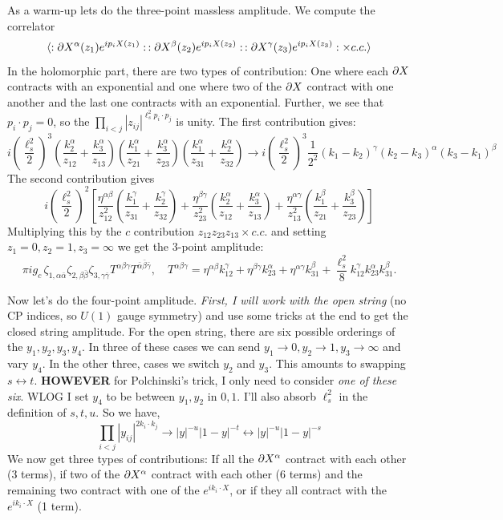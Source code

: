 \documentclass[11pt, class=article, crop=false]{standalone}
\begin{document}
\begin{enumerate}
	As a warm-up lets do the three-point massless amplitude. We compute the correlator
	\[
		\braket{:\partial X^\alpha(z_1) e^{i p_i X(z_1)}: \, :\partial X^\beta(z_2) e^{i p_i X(z_2)}: \, :\partial X^\gamma(z_3) e^{i p_i X(z_3)}: \times c.c.}
	\]
	In the holomorphic part, there are two types of contribution: One where each $\partial X$ contracts with an exponential and one where two of the $\partial X$ contract with one another and the last one contracts with an exponential. Further, we see that $p_i \cdot p_j = 0$, so the $\prod_{i<j} |z_{ij}|^{\ell_s^2 p_i \cdot p_j}$ is unity. The first contribution gives:
	\[
		i \left(\frac{\ell_s^2}{2}\right)^3 
		\left(\frac{k_2^\alpha}{z_{12}} + \frac{k_3^\alpha}{z_{13}}\right) 
		\left(\frac{k_1^\alpha}{z_{21}} + \frac{k_3^\alpha}{z_{23}}\right)
		\left(\frac{k_1^\alpha}{z_{31}} + \frac{k_2^\alpha}{z_{32}}\right)
		\to i  \left(\frac{\ell_s^2}{2}\right)^3 \frac{1}{2^2}  (k_1-k_2)^\gamma (k_2 - k_3)^\alpha (k_3 - k_1)^\beta
	\]
	The second contribution gives
	\[
		i \left(\frac{\ell_s^2}{2}\right)^2 
		\left[ \frac{\eta^{\alpha \beta}}{z_{12}^2} \left(\frac{k_1^\gamma}{z_{31}} + \frac{k_2^\gamma}{z_{32}} \right)
		+ \frac{\eta^{\beta \gamma}}{z_{23}^2} \left(\frac{k_2^\alpha}{z_{12}} + \frac{k_3^\alpha}{z_{13}} \right)
		+ \frac{\eta^{\alpha \gamma}}{z_{13}^2} \left(\frac{k_1^\beta}{z_{21}} + \frac{k_3^\beta}{z_{23}} \right) \right]
	\]
	Multiplying this by the $c$ contribution $z_{12} z_{23} z_{13} \times c.c.$ and setting $z_1 = 0, z_2 = 1, z_3 = \infty$ we get the 3-point amplitude:
	\begin{equation}\label{eq:3ptmassless}
		\pi i g_c \, \zeta_{1, \alpha \bar \alpha} \zeta_{2, \beta \bar \beta} \zeta_{3, \gamma \bar \gamma} T^{\alpha \beta \gamma} T^{\bar \alpha \bar \beta \bar \gamma}, \quad T^{\alpha \beta \gamma} = \eta^{\alpha \beta} k_{12}^\gamma + \eta^{\beta \gamma} k_{23}^\alpha + \eta^{\alpha \gamma} k_{31}^\beta + \frac{\ell_s^2}{8} k_{12}^\gamma k_{23}^\alpha k_{31}^\beta.
	\end{equation}
	
	Now let's do the four-point amplitude. \emph{First, I will work with the open string} (no CP indices, so $U(1)$ gauge symmetry) and use some tricks at the end to get the closed string amplitude. For the open string, there are six possible orderings of the $y_1, y_2, y_3, y_4$. In three of these cases we can send $y_1\to 0, y_2 \to 1, y_3 \to \infty$ and vary $y_4$. In the other three, cases we switch $y_2$ and $y_3$. This amounts to swapping $s\leftrightarrow t$. \textbf{HOWEVER} for Polchinski's trick, I only need to consider \emph{one of these six}. WLOG I set $y_4$ to be between $y_1, y_2$ in $0,1$.
	I'll also absorb $\ell_s^2$ in the definition of $s,t,u$. So we have,
	\[
		\prod_{i<j} |y_{ij}|^{2 k_i \cdot k_j} \to |y|^{-u} |1-y|^{-t} \leftrightarrow |y|^{-u} |1-y|^{- s}
	\]
	We now get three types of contributions: If all the $\partial X^\alpha$ contract with each other (3 terms), if two of the $\partial X^\alpha$ contract with each other (6 terms) and the remaining two contract with one of the $e^{i k_i \cdot X}$, or if they all contract with the $e^{i k_i \cdot X}$ (1 term). 


\end{enumerate}
\end{document}
